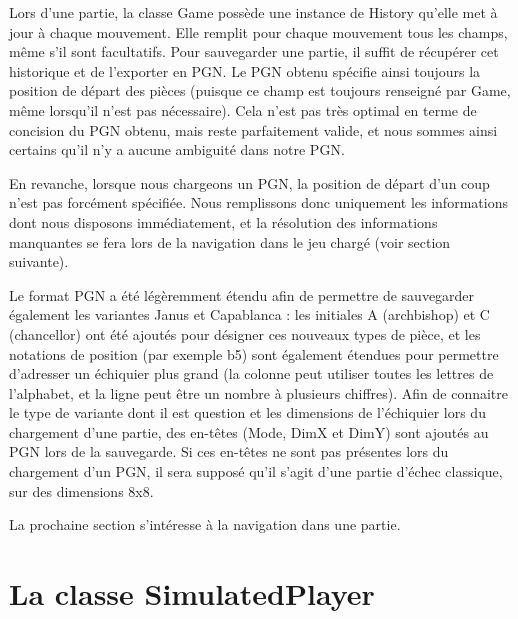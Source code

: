 \documentclass[11pt]{article}
\begin{document}
Lors d'une partie, la classe Game possède une instance de History qu'elle met à jour à chaque mouvement. Elle remplit pour chaque mouvement tous les champs, même s'il sont facultatifs. Pour sauvegarder une partie, il suffit de récupérer cet historique et de l'exporter en PGN. Le PGN obtenu spécifie ainsi toujours la position de départ des pièces (puisque ce champ est toujours renseigné par Game, même lorsqu'il n'est pas nécessaire). Cela n'est pas très optimal en terme de concision du PGN obtenu, mais reste parfaitement valide, et nous sommes ainsi certains qu'il n'y a aucune ambiguité dans notre PGN.

En revanche, lorsque nous chargeons un PGN, la position de départ d'un coup n'est pas forcément spécifiée. Nous remplissons donc uniquement les informations dont nous disposons immédiatement, et la résolution des informations manquantes se fera lors de la navigation dans le jeu chargé (voir section suivante).\newline

Le format PGN a été légèremment étendu afin de permettre de sauvegarder également les variantes Janus et Capablanca : les initiales A (archbishop) et C (chancellor) ont été ajoutés pour désigner ces nouveaux types de pièce, et les notations de position (par exemple b5) sont également étendues pour permettre d'adresser un échiquier plus grand (la colonne peut utiliser toutes les lettres de l'alphabet, et la ligne peut être un nombre à plusieurs chiffres). Afin de connaitre le type de variante dont il est question et les dimensions de l'échiquier lors du chargement d'une partie, des en-têtes (Mode, DimX et DimY) sont ajoutés au PGN lors de la sauvegarde. Si ces en-têtes ne sont pas présentes lors du chargement d'un PGN, il sera supposé qu'il s'agit d'une partie d'échec classique, sur des dimensions 8x8.\newline

La prochaine section s'intéresse à la navigation dans une partie.

\section{La classe SimulatedPlayer}
\end{document}
